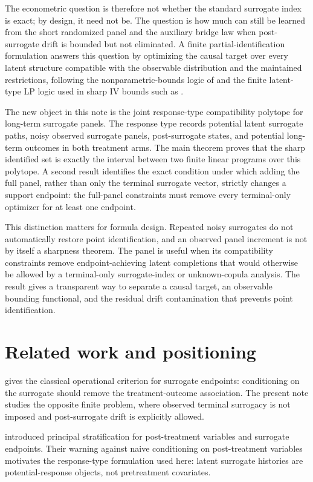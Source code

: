 \documentclass[11pt]{article}
\theoremstyle{definition}
\theoremstyle{plain}
\theoremstyle{remark}
\begin{document}
The econometric question is therefore not whether the standard surrogate index is exact; by design, it need not be.  The question is how much can still be learned from the short randomized panel and the auxiliary bridge law when post-surrogate drift is bounded but not eliminated.  A finite partial-identification formulation answers this question by optimizing the causal target over every latent structure compatible with the observable distribution and the maintained restrictions, following the nonparametric-bounds logic of \cite{Manski1990} and the finite latent-type LP logic used in sharp IV bounds such as \cite{BalkePearl1997}.

The new object in this note is the joint response-type compatibility polytope for long-term surrogate panels.  The response type records potential latent surrogate paths, noisy observed surrogate panels, post-surrogate states, and potential long-term outcomes in both treatment arms.  The main theorem proves that the sharp identified set is exactly the interval between two finite linear programs over this polytope.  A second result identifies the exact condition under which adding the full panel, rather than only the terminal surrogate vector, strictly changes a support endpoint: the full-panel constraints must remove every terminal-only optimizer for at least one endpoint.

This distinction matters for formula design.  Repeated noisy surrogates do not automatically restore point identification, and an observed panel increment is not by itself a sharpness theorem.  The panel is useful when its compatibility constraints remove endpoint-achieving latent completions that would otherwise be allowed by a terminal-only surrogate-index or unknown-copula analysis.  The result gives a transparent way to separate a causal target, an observable bounding functional, and the residual drift contamination that prevents point identification.

\section{Related work and positioning}
\cite{Prentice1989} gives the classical operational criterion for surrogate endpoints: conditioning on the surrogate should remove the treatment-outcome association.  The present note studies the opposite finite problem, where observed terminal surrogacy is not imposed and post-surrogate drift is explicitly allowed.

\cite{FrangakisRubin2002} introduced principal stratification for post-treatment variables and surrogate endpoints.  Their warning against naive conditioning on post-treatment variables motivates the response-type formulation used here: latent surrogate histories are potential-response objects, not pretreatment covariates.
\end{document}
